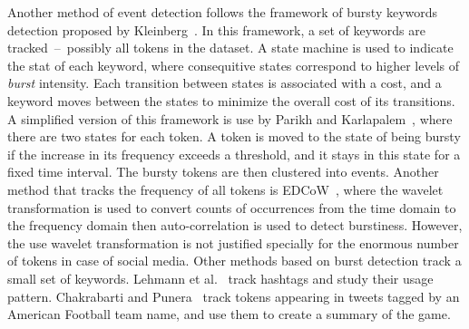\documentclass[letterpaper,12pt,titlepage,oneside,final]{book}
\begin{document}
Another method of event detection follows the framework of bursty keywords detection proposed by Kleinberg~\cite{kleinberg2003bursty}. %
In this framework, a set of keywords are tracked~--~possibly all tokens in the dataset.
A state machine is used to indicate the stat of each keyword, 
where consequitive states correspond to higher levels of \emph{burst} intensity. 
Each transition between states is associated with a cost, 
and a keyword moves between the states to minimize the overall cost of its transitions.
A simplified version of this framework is use by Parikh and Karlapalem~\cite{parikh2013events},
where there are two states for each token. 
A token is moved to the state of being bursty
if the increase in its frequency exceeds a threshold,
and it stays in this state for a fixed time interval. 
The bursty tokens are then clustered into events.
Another method that tracks the frequency of all tokens is EDCoW~\cite{weng2011event}, 
where the wavelet transformation is used to convert counts of occurrences from the time domain to the frequency domain
then auto-correlation is used to detect burstiness.
However, the use wavelet transformation is not justified
specially for the enormous number of tokens in case of social media.
Other methods based on burst detection track a small set of keywords. 
Lehmann et al.~\cite{lehmann2012dynamical} track hashtags and study 
their usage pattern.
Chakrabarti and Punera~\cite{chakrabarti2011event} track 
tokens appearing in tweets tagged by an American Football team name,
and use them to create a summary of the game.
\end{document}
